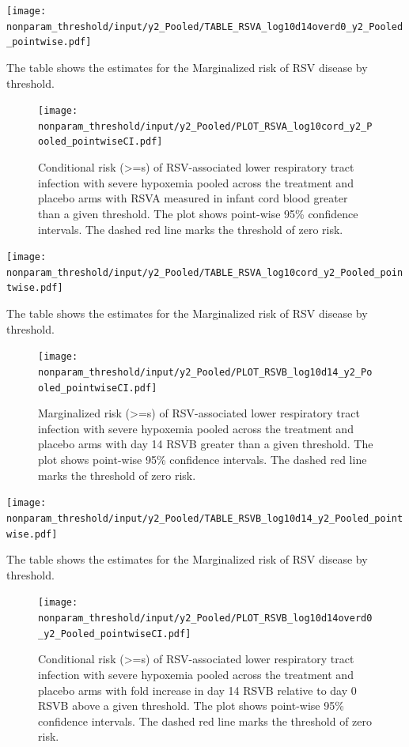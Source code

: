 \documentclass[11pt]{article}
\begin{document}
\begin{table}[H]
\centering
\texttt{[image: nonparam\_threshold/input/y2\_Pooled/TABLE\_RSVA\_log10d14overd0\_y2\_Pooled\_pointwise.pdf]}
\caption{The table shows the  estimates for the Marginalized risk of RSV disease by threshold. }
\end{table}

\begin{figure}[H]
\centering
\texttt{[image: nonparam\_threshold/input/y2\_Pooled/PLOT\_RSVA\_log10cord\_y2\_Pooled\_pointwiseCI.pdf]}
\caption{Conditional risk (>=s) of RSV-associated lower respiratory tract infection with severe hypoxemia pooled across the treatment and placebo arms with RSVA measured in infant cord blood greater than a given threshold. The plot shows point-wise 95\% confidence intervals. The dashed red line marks the threshold of zero risk.}
\end{figure}

\begin{table}[H]
\centering
\texttt{[image: nonparam\_threshold/input/y2\_Pooled/TABLE\_RSVA\_log10cord\_y2\_Pooled\_pointwise.pdf]}
\caption{The table shows the  estimates for the Marginalized risk of RSV disease by threshold. }
\end{table}

\begin{figure}[H]
\centering
\texttt{[image: nonparam\_threshold/input/y2\_Pooled/PLOT\_RSVB\_log10d14\_y2\_Pooled\_pointwiseCI.pdf]}
\caption{Marginalized risk (>=s) of RSV-associated lower respiratory tract infection with severe hypoxemia pooled across the treatment and placebo arms with day 14 RSVB greater than a given threshold. The plot shows point-wise 95\% confidence intervals. The dashed red line marks the threshold of zero risk.}
\end{figure}

\begin{table}[H]
\centering
\texttt{[image: nonparam\_threshold/input/y2\_Pooled/TABLE\_RSVB\_log10d14\_y2\_Pooled\_pointwise.pdf]}
\caption{The table shows the  estimates for the Marginalized risk of RSV disease by threshold. }
\end{table}

\begin{figure}[H]
\centering
\texttt{[image: nonparam\_threshold/input/y2\_Pooled/PLOT\_RSVB\_log10d14overd0\_y2\_Pooled\_pointwiseCI.pdf]}
\caption{Conditional risk (>=s) of RSV-associated lower respiratory tract infection with severe hypoxemia pooled across the treatment and placebo arms with fold increase in day 14 RSVB relative to day 0 RSVB above a given threshold. The plot shows point-wise 95\% confidence intervals. The dashed red line marks the threshold of zero risk.}
\end{figure}
\end{document}
